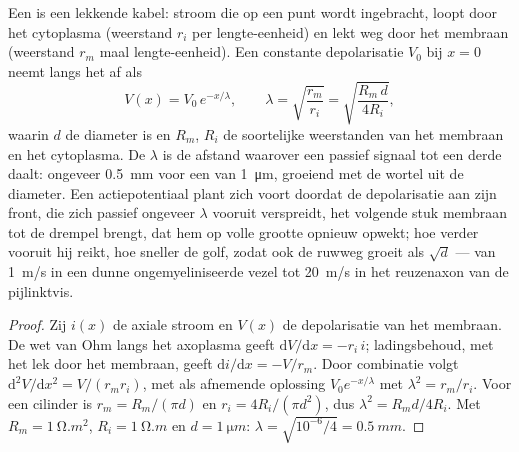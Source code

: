 \begin{theorem}\label{thm:b2:neurons-synapses:cable}
Een  is een lekkende kabel: stroom die op een punt wordt ingebracht,
loopt door het cytoplasma (weerstand $r_i$ per lengte-eenheid) en lekt weg
door het membraan (weerstand $r_m$ maal lengte-eenheid). Een constante
depolarisatie $V_0$ bij $x = 0$ neemt langs het  af als
\[
V(x) = V_0\,e^{-x/\lambda}, \qquad \lambda = \sqrt{\frac{r_m}{r_i}} = \sqrt{\frac{R_m\,d}{4R_i}},
\]
waarin $d$ de diameter is en $R_m$, $R_i$ de soortelijke weerstanden van
het membraan en het cytoplasma. De \emph{}
$\lambda$ is de afstand waarover een passief signaal tot een derde daalt:
ongeveer \qty{0.5}{mm} voor een  van \qty{1}{\micro m}, groeiend met
de wortel uit de diameter. Een actiepotentiaal plant zich voort doordat de
depolarisatie aan zijn front, die zich passief ongeveer $\lambda$ vooruit
verspreidt, het volgende stuk membraan tot de drempel brengt, dat hem op
volle grootte opnieuw opwekt; hoe verder vooruit hij reikt, hoe sneller de
golf, zodat ook de  ruwweg groeit als $\sqrt{d}$ --- van
\qty{1}{m/s} in een dunne ongemyeliniseerde vezel tot \qty{20}{m/s} in het
reuzenaxon van de pijlinktvis.
\end{theorem}
\begin{proof}
Zij $i(x)$ de axiale stroom en $V(x)$ de depolarisatie van het membraan. De
wet van Ohm langs het axoplasma geeft $\mathrm{d}V/
\mathrm{d}x = -r_i\,i$; ladingsbehoud, met het lek door het membraan,
geeft $\mathrm{d}i/\mathrm{d}x = -V/r_m$. Door combinatie volgt
$\mathrm{d}^{2}V/\mathrm{d}x^{2} = V/(r_m r_i)$, met als afnemende
oplossing $V_0 e^{-x/\lambda}$ met $\lambda^{2} = r_m/r_i$. Voor een
cilinder is $r_m = R_m/(\pi d)$ en $r_i = 4R_i/(\pi d^{2})$, dus
$\lambda^{2} = R_m d/4R_i$. Met $R_m = \qty{1}{\ohm.m^2}$, $R_i =
\qty{1}{\ohm.m}$ en $d = \qty{1}{\micro m}$: $\lambda = \sqrt{10^{-6}
/4} = \qty{0.5}{mm}$.
\end{proof}

